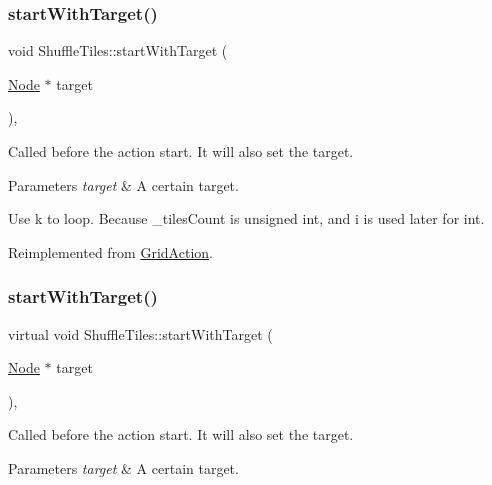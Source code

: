 \subsubsection{\texorpdfstring{start\+With\+Target()}{startWithTarget()}\hspace{0.1cm}{\footnotesize\ttfamily [1/2]}}
{\footnotesize\ttfamily void Shuffle\+Tiles\+::start\+With\+Target (\begin{DoxyParamCaption}\item[{\hyperlink{classNode}{Node} $\ast$}]{target }\end{DoxyParamCaption})\hspace{0.3cm}{\ttfamily [override]}, {\ttfamily [virtual]}}

Called before the action start. It will also set the target.


\begin{DoxyParams}{Parameters}
{\em target} & A certain target. \\
\hline
\end{DoxyParams}
Use k to loop. Because \+\_\+tiles\+Count is unsigned int, and i is used later for int.

Reimplemented from \hyperlink{classGridAction_a33e2c1bc95bbcf6b16428097b4fd4b61}{Grid\+Action}.

\mbox{\label{classShuffleTiles_af9880bf4abd44f5b605ab1a47159e817}} 
\subsubsection{\texorpdfstring{start\+With\+Target()}{startWithTarget()}\hspace{0.1cm}{\footnotesize\ttfamily [2/2]}}
{\footnotesize\ttfamily virtual void Shuffle\+Tiles\+::start\+With\+Target (\begin{DoxyParamCaption}\item[{\hyperlink{classNode}{Node} $\ast$}]{target }\end{DoxyParamCaption})\hspace{0.3cm}{\ttfamily [override]}, {\ttfamily [virtual]}}

Called before the action start. It will also set the target.


\begin{DoxyParams}{Parameters}
{\em target} & A certain target. \\
\hline
\end{DoxyParams}



